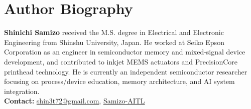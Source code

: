 \documentclass[conference]{IEEEtran}
\begin{document}



\section*{Author Biography}
\noindent\textbf{Shinichi Samizo}
received the M.S. degree in Electrical and Electronic Engineering from Shinshu University, Japan.  
He worked at Seiko Epson Corporation as an engineer in semiconductor memory and mixed-signal device development, and contributed to inkjet MEMS actuators and PrecisionCore printhead technology.  
He is currently an independent semiconductor researcher focusing on process/device education, memory architecture, and AI system integration.\\[2pt]
\textbf{Contact:} \href{mailto:shin3t72@gmail.com}{shin3t72@gmail.com}, 
\href{https://github.com/Samizo-AITL}{Samizo-AITL}
\end{document}
